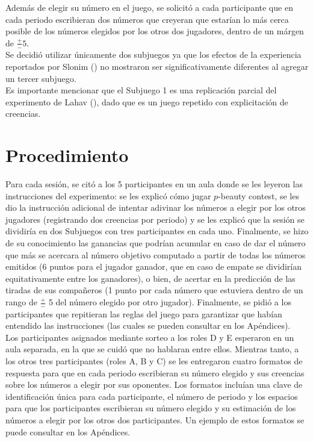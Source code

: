 Además de elegir su número en el juego, se solicitó a cada participante que en cada periodo escribieran dos números que creyeran que estarían lo más cerca posible de los números elegidos por los otros dos jugadores, dentro de un márgen de $\frac{+}{-}5$.\\

Se decidió utilizar únicamente dos subjuegos ya que los efectos de la experiencia reportados por Slonim (\citeyear{Slonim}) no mostraron ser significativamente diferentes al agregar un tercer subjuego.\\

Es importante mencionar que el Subjuego 1 es una replicación parcial del experimento de Lahav (\citeyear{Lahav}), dado que es un juego repetido con explicitación de creencias.

\section{Procedimiento}

Para cada sesión, se citó a los 5 participantes en un aula donde se les leyeron las instrucciones del experimento: se les explicó cómo jugar $p$-beauty contest, se les dio la instrucción adicional de intentar adivinar los números a elegir por los otros jugadores (registrando dos creencias por periodo) y se les explicó que la sesión se dividiría en dos Subjuegos con tres participantes en cada uno. Finalmente, se hizo de su conocimiento las ganancias que podrían acumular en caso de dar el número que más se acercara al número objetivo computado a partir de todas los números emitidos (6 puntos para el jugador ganador, que en caso de empate se dividirían equitativamente entre los ganadores), o bien, de acertar en la predicción de las tiradas de sus compañeros (1 punto por cada número que estuviera dentro de un rango de $\frac{+}{-}$ 5 del número elegido por otro jugador). Finalmente, se pidió a los participantes que repitieran las reglas del juego para garantizar que habían entendido las instrucciones (las cuales se pueden consultar en los Apéndices).\\

Los participantes asignados mediante sorteo a los roles D y E esperaron en un aula separada, en la que se cuidó que no hablaran entre ellos. Mientras tanto, a los otros tres participantes (roles A, B y C) se les entregaron cuatro formatos de respuesta para que en cada periodo escribieran su número elegido y sus creencias sobre los números a elegir por sus oponentes. Los formatos incluían una clave de identificación única para cada participante, el número de periodo y los espacios para que los participantes escribieran su número elegido y su estimación de los números a elegir por los otros dos participantes. Un ejemplo de estos formatos se puede consultar en los Apéndices.\\


